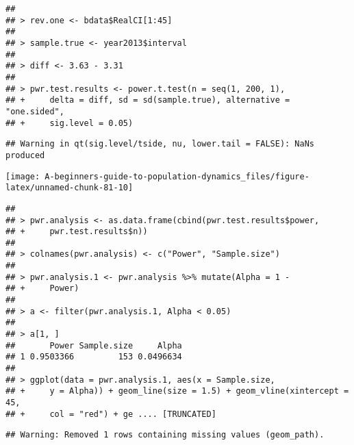 \documentclass[]{book}
\begin{document}
\begin{verbatim}
## 
## > rev.one <- bdata$RealCI[1:45]
## 
## > sample.true <- year2013$interval
## 
## > diff <- 3.63 - 3.31
## 
## > pwr.test.results <- power.t.test(n = seq(1, 200, 1), 
## +     delta = diff, sd = sd(sample.true), alternative = "one.sided", 
## +     sig.level = 0.05)
\end{verbatim}

\begin{verbatim}
## Warning in qt(sig.level/tside, nu, lower.tail = FALSE): NaNs produced
\end{verbatim}

\begin{center}\texttt{[image: A-beginners-guide-to-population-dynamics\_files/figure-latex/unnamed-chunk-81-10]} \end{center}

\begin{verbatim}
## 
## > pwr.analysis <- as.data.frame(cbind(pwr.test.results$power, 
## +     pwr.test.results$n))
## 
## > colnames(pwr.analysis) <- c("Power", "Sample.size")
## 
## > pwr.analysis.1 <- pwr.analysis %>% mutate(Alpha = 1 - 
## +     Power)
## 
## > a <- filter(pwr.analysis.1, Alpha < 0.05)
## 
## > a[1, ]
##       Power Sample.size     Alpha
## 1 0.9503366         153 0.0496634
## 
## > ggplot(data = pwr.analysis.1, aes(x = Sample.size, 
## +     y = Alpha)) + geom_line(size = 1.5) + geom_vline(xintercept = 45, 
## +     col = "red") + ge .... [TRUNCATED]
\end{verbatim}

\begin{verbatim}
## Warning: Removed 1 rows containing missing values (geom_path).
\end{verbatim}
\end{document}

